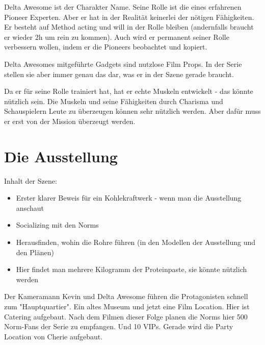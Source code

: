 \begin{npcBox}[title=Delta Awesome - spielt das Opfer]
    \begin{consequences}
    \item {}
    \item {}
    \item {}
    \end{consequences}

    \begin{npcDescription}
    Delta Awesome ist der Charakter Name. Seine Rolle ist die eines erfahrenen Pioneer Experten. Aber er hat in der Realität keinerlei der nötigen Fähigkeiten. Er besteht auf Method acting und will in der Rolle bleiben (andernfalls braucht er wieder 2h um rein zu kommen). Auch wird er permanent seiner Rolle verbessern wollen, indem er die Pioneers beobachtet und kopiert.

    Delta Awesomes mitgeführte Gadgets sind nutzlose Film Props. In der Serie stellen sie aber immer genau das dar, was er in der Szene gerade braucht.

    Da er für seine Rolle trainiert hat, hat er echte Muskeln entwickelt - das könnte nützlich sein. Die Muskeln und seine Fähigkeiten durch Charisma und Schauspielern Leute zu überzeugen können sehr nützlich werden. Aber dafür muss er erst von der Mission überzeugt werden.
    \end{npcDescription}

\end{npcBox}


\section{Die Ausstellung}

Inhalt der Szene:

\begin{itemize}
\item Erster klarer Beweis für ein Kohlekraftwerk - wenn man die Ausstellung anschaut
\item Socializing mit den Norms
\item Herausfinden, wohin die Rohre führen (in den Modellen der Ausstellung und den Plänen)
\item Hier findet man mehrere Kilogramm der Proteinpaste, sie könnte nützlich werden
\end{itemize}

Der Kameramann Kevin und Delta Awesome führen die Protagonisten schnell zum "Hauptquartier". Ein altes Museum und jetzt eine Film Location. Hier ist Catering aufgebaut. Nach dem Filmen dieser Folge planen die Norms hier 500 Norm-Fans der Serie zu empfangen. Und 10 VIPs. Gerade wird die Party Location von Cherie aufgebaut.

